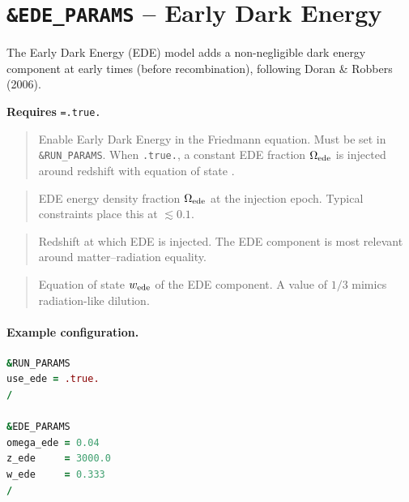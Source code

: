 \section{\texttt{\&EDE\_PARAMS} -- Early Dark Energy}
\label{sec:ede_params}

The Early Dark Energy (EDE) model adds a non-negligible dark energy
component at early times (before recombination), following
Doran \& Robbers (2006).

\textbf{Requires} \texttt{=.true.}

\label{param:use_ede}

\begin{quote}
Enable Early Dark Energy in the Friedmann equation.  Must be set in
\texttt{\&RUN\_PARAMS}.  When \texttt{.true.}, a constant EDE fraction
$\Omega_{\rm ede}$ is injected around redshift  with
equation of state .
\end{quote}

\label{param:omega_ede}

\begin{quote}
EDE energy density fraction $\Omega_{\rm ede}$ at the injection epoch.
Typical constraints place this at $\lesssim 0.1$.
\end{quote}

\label{param:z_ede}

\begin{quote}
Redshift at which EDE is injected.  The EDE component is most relevant
around matter--radiation equality.
\end{quote}

\label{param:w_ede}

\begin{quote}
Equation of state $w_{\rm ede}$ of the EDE component.  A value of
$1/3$ mimics radiation-like dilution.
\end{quote}

\paragraph{Example configuration.}
\begin{lstlisting}[language=Fortran]
&RUN_PARAMS
use_ede = .true.
/

&EDE_PARAMS
omega_ede = 0.04
z_ede     = 3000.0
w_ede     = 0.333
/
\end{lstlisting}


